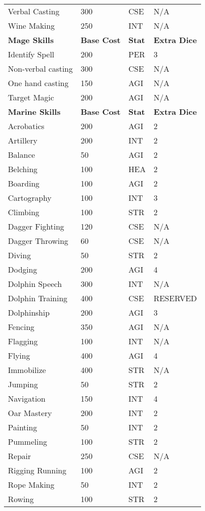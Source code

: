 \begin{multicols*}{2}
\begin{tcolorbox}[breakable,boxrule=0pt]
\begin{xtabular}{l l l l}
Verbal Casting & 300 & CSE & N/A \\
Wine Making & 250 & INT & N/A \\
\midrule
\textbf{Mage Skills} & \textbf{Base Cost} & \textbf{Stat} & \textbf{Extra Dice}\\
Identify Spell & 200 & PER & 3 \\
Non-verbal casting & 300 & CSE & N/A \\
One hand casting & 150 & AGI & N/A \\
Target Magic & 200 & AGI & N/A \\
\midrule
\textbf{Marine Skills} & \textbf{Base Cost} & \textbf{Stat} & \textbf{Extra Dice}\\
Acrobatics & 200 & AGI & 2 \\
Artillery & 200 & INT & 2 \\
Balance & 50 & AGI & 2 \\
Belching & 100 & HEA & 2 \\
Boarding & 100 & AGI & 2 \\
Cartography & 100 & INT & 3 \\
Climbing & 100 & STR & 2 \\
Dagger Fighting & 120 & CSE & N/A \\
Dagger Throwing & 60 & CSE & N/A \\
Diving & 50 & STR & 2 \\
Dodging & 200 & AGI & 4 \\
Dolphin Speech & 300 & INT & N/A \\
Dolphin Training & 400 & CSE & RESERVED \\
Dolphinship & 200 & AGI & 3 \\
Fencing & 350 & AGI & N/A \\
Flagging & 100 & INT & N/A \\
Flying & 400 & AGI & 4 \\
Immobilize & 400 & STR & N/A \\
Jumping & 50 & STR & 2 \\
Navigation & 150 & INT & 4 \\
Oar Mastery & 200 & INT & 2 \\
Painting & 50 & INT & 2 \\
Pummeling & 100 & STR & 2 \\
Repair & 250 & CSE & N/A \\
Rigging Running & 100 & AGI & 2 \\
Rope Making & 50 & INT & 2 \\
Rowing & 100 & STR & 2 \\

\end{xtabular}
\end{tcolorbox}
\end{multicols*}
